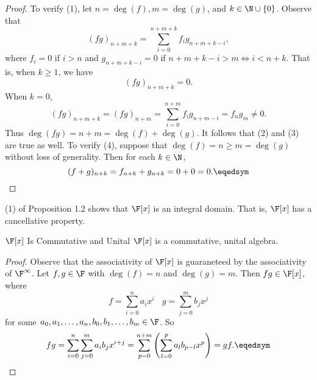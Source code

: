 \documentclass[linearalgebraII]{subfiles}
\begin{document}
    \begin{proof}
        To verify (1), let $n=\deg(f), m=\deg(g)$, and $k\in \N\cup \left\lbrace 0 \right\rbrace$. Observe that
        \begin{equation*}
            (fg)_{n+m+k} = \sum^{n+m+k}_{i=0} f_ig_{n+m+k-i},
        \end{equation*}
        where $f_i=0$ if $i>n$ and $g_{n+m+k-i}=0$ if $n+m+k-i>m\iff i<n+k$. That is, when $k\geq 1$, we have
        \begin{equation*}
            (fg)_{n+m+k} = 0.
        \end{equation*}
        When $k=0$,
        \begin{equation*}
            (fg)_{n+m+k} = (fg)_{n+m} = \sum^{n+m}_{i=0} f_ig_{n+m-i} = f_ng_m \neq 0.
        \end{equation*}
        Thus $\deg(fg) = n+m = \deg(f) + \deg(g)$. It follows that (2) and (3) are true as well. To verify (4), suppose that $\deg(f) = n \geq m = \deg(g)$ without loss of generality. Then for each $k\in \N$,
        \begin{equation*}
            (f+g)_{n+k} = f_{n+k} + g_{n+k} = 0 + 0 = 0. \eqedsym
        \end{equation*}
    \end{proof}

    \begin{remark}
        (1) of Proposition 1.2 shows that $\F[x]$ is an integral domain. That is, $\F[x]$ has a cancellative property.
    \end{remark}

    \begin{cor}{$\F[x]$ Is Commutative and Unital}
        $\F[x]$ is a commutative, unital algebra.
    \end{cor}	

    \begin{proof}
        Observe that the associativity of $\F[x]$ is guaraneteed by the associativity of $\F^\infty$. Let $f,g\in \F$ with $\deg(f) = n$ and $\deg(g) = m$. Then $fg\in \F[x]$, where
        \begin{equation*}
            f = \sum^n_{i=0} a_ix^i \ \ \ \ g = \sum^m_{j=0} b_jx^j 
        \end{equation*}
        for some $a_0, a_1, \ldots, a_n, b_0, b_1, \ldots, b_m\in \F$. So
        \begin{equation*}
            fg = \sum^n_{i=0}\sum^m_{j=0} a_ib_jx^{i+j} = \sum^{n+m}_{p=0} \left( \sum^p_{l=0} a_lb_{p-l}x^p \right) = gf. \eqedsym
        \end{equation*}
    \end{proof}
\end{document}
